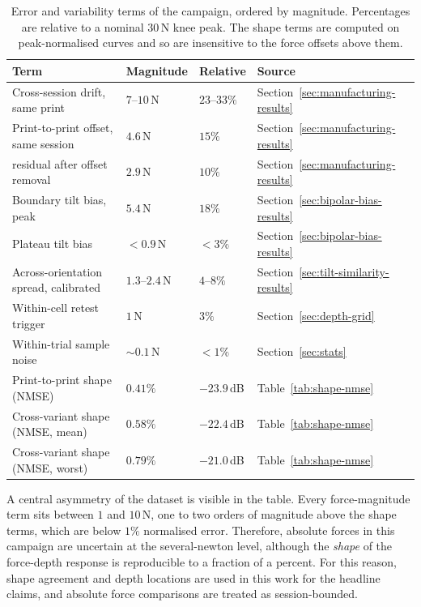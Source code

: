 \begin{table}[ht]
\centering
\caption[Error budget]{Error and variability terms of the campaign,
ordered by magnitude. Percentages are relative to a nominal
$30$\,N knee peak. The shape terms are computed on peak-normalised
curves and so are insensitive to the force offsets above them.}
\label{tab:error-budget}
\small
\begin{tabular}{llll}
\toprule
Term & Magnitude & Relative & Source \\
\midrule
Cross-session drift, same print & $7$--$10$\,N & $23$--$33\%$ & Section~\ref{sec:manufacturing-results} \\
Print-to-print offset, same session & $4.6$\,N & $15\%$ & Section~\ref{sec:manufacturing-results} \\
\quad residual after offset removal & $2.9$\,N & $10\%$ & Section~\ref{sec:manufacturing-results} \\
Boundary tilt bias, peak & $5.4$\,N & $18\%$ & Section~\ref{sec:bipolar-bias-results} \\
Plateau tilt bias & $<0.9$\,N & $<3\%$ & Section~\ref{sec:bipolar-bias-results} \\
Across-orientation spread, calibrated & $1.3$--$2.4$\,N & $4$--$8\%$ & Section~\ref{sec:tilt-similarity-results} \\
Within-cell retest trigger & $1$\,N & $3\%$ & Section~\ref{sec:depth-grid} \\
Within-trial sample noise & $\sim 0.1$\,N & $<1\%$ & Section~\ref{sec:stats} \\
\midrule
Print-to-print shape (NMSE) & $0.41\%$ & $-23.9$\,dB & Table~\ref{tab:shape-nmse} \\
Cross-variant shape (NMSE, mean) & $0.58\%$ & $-22.4$\,dB & Table~\ref{tab:shape-nmse} \\
Cross-variant shape (NMSE, worst) & $0.79\%$ & $-21.0$\,dB & Table~\ref{tab:shape-nmse} \\
\bottomrule
\end{tabular}
\end{table}

A central asymmetry of the dataset is visible in the table. Every
force-magnitude term sits between $1$ and $10$\,N, one
to two orders of magnitude above the shape terms, which are below
$1\%$ normalised error. Therefore, absolute forces in this campaign are
uncertain at the several-newton level, although the \emph{shape} of the
force-depth response is reproducible to a fraction of a percent. For
this reason, shape agreement and depth locations are used in this work
for the headline claims, and absolute force comparisons are treated as
session-bounded.

